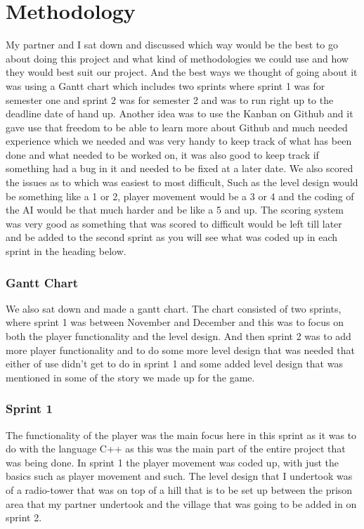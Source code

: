 \chapter{Methodology}
My partner and I sat down and discussed which way would be the best to go about doing this project and what kind of methodologies we could use and how they would best suit our project. And the best ways we thought of going about it was using a Gantt chart which includes two sprints where sprint 1 was for semester one and sprint 2 was for semester 2 and was to run right up to the deadline date of hand up. Another idea was to use the Kanban on Github and it gave use that freedom to be able to learn more about Github and much needed experience which we needed and was very handy to keep track of what has been done and what needed to be worked on, it was also good to keep track if something had a bug in it and needed to be fixed at a later date.
\newline
\newline
We also scored the issues as to which was easiest to most difficult, Such as the level design would be something like a 1 or 2, player movement would be a 3 or 4 and the coding of the AI would be that much harder and be like a 5 and up. The scoring system was very good as something that was scored to difficult would be left till later and be added to the second sprint as you will see what was coded up in each sprint in the heading below.
 
\subsection{Gantt Chart}
We also sat down and made a gantt chart. The chart consisted of two sprints, where sprint 1 was between November and December and this was to focus on both the player functionality and the level design. And then sprint 2 was to add more player functionality and to do some more level design that was needed that either of use didn't get to do in sprint 1 and some added level design that was mentioned in some of the story we made up for the game. 

\subsection{Sprint 1}
The functionality of the player was the main focus here in this sprint as it was to do with the language C++ as this was the main part of the entire project that was being done. In sprint 1 the player movement was coded up, with just the basics such as player movement and such. The level design that I undertook was of a radio-tower that was on top of a hill that is to be set up between the prison area that my partner undertook and the village that was going to be added in on sprint 2.
